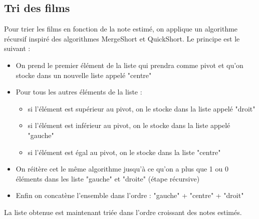 \subsection{Tri des films}
Pour trier les films en fonction de la note estimé, on applique un algorithme récursif inspiré des algorithmes MergeShort et QuickShort. Le principe est le suivant :
\begin{itemize}
	\item On prend le premier élément de la liste qui prendra comme pivot et qu'on stocke dans un nouvelle liste appelé "centre"
	\item Pour tous les autres éléments de la liste :
	\begin{itemize}
		\item si l'élément est supérieur au pivot, on le stocke dans la liste appelé "droit"
		\item si l'élément est inférieur au pivot, on le stocke dans la liste appelé "gauche"
		\item si l'élément est égal au pivot, on le stocke dans la liste "centre"
	\end{itemize}
	\item On réitère cet le même algorithme jusqu'à ce qu'on a plus que 1 ou 0 éléments dans les liste "gauche" et "droite" (étape récursive)
	\item Enfin on concatène l'ensemble dans l'ordre : "gauche" + "centre" + "droit"
\end{itemize}
La liste obtenue est maintenant triée dans l'ordre croissant des notes estimés.
